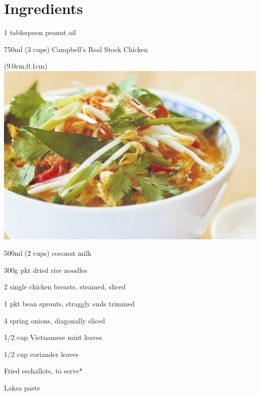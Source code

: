 

\section*{Ingredients}
\bigskip
\begin{ingredients-list}
	\item 1 tablespoon peanut oil
 	\item 750ml (3 cups) Campbell's Real Stock Chicken
		\begin{textblock*}{11cm}(9.0cm,0.1cm) %
			\includegraphics[scale=0.34]{./img/laksa.jpg}
		\end{textblock*}
	\item 500ml (2 cups) coconut milk
	\item 300g pkt dried rice noodles
	\item 2 single chicken breasts, steamed, sliced
	\item 1 pkt bean sprouts, straggly ends trimmed
	\item 4 spring onions, diagonally sliced
	\item 1/2 cup Vietnamese mint leaves
	\item 1/2 cup coriander leaves
	\item Fried eschallots, to serve*
\end{ingredients-list}
Laksa paste

